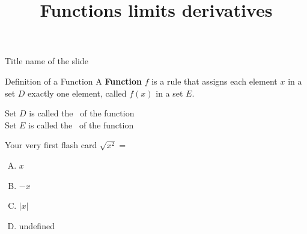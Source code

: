 \documentclass{beamer}
\title{Functions limits derivatives}
\author{}
\institute{\large{\textbf{Conteudo}} \\{6pt \lipsum[1]}}
\date{}
\begin{document}

\begin{frame}
\titlepage
\end{frame}

\begin{frame}[t]{Title name of the slide}\vspace{10pt}
    \begin{block}{Definition of a Function}
        \vspace{0.5em}
        A \textbf{Function} $f$ is a rule that assigns each element $x$ in a set $D$ exactly one element, called $f(x)$ in a set $E$.
        \vspace{0.5em}        
    \end{block}
\vspace{10pt}
Set $D$ is called the 
\, of the function \\[10pt]

Set $E$ is called the 
\, of the function


\end{frame}


\begin{frame}{Your very first flash card} \vspace{10pt}
    $\sqrt{x^2}=$ \\ [10pt]
    \begin{enumerate}[(A)]
        \item $x$
        \item $-x$
        \item $|x|$
        \item undefined
    \end{enumerate}
\end{frame}
\end{document}
